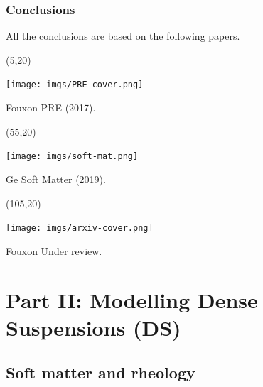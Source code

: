 \begin{frame}[noframenumbering,t]
  \frametitle{Conclusions}

  All the conclusions are based on the following papers.
  
  \begin{textblock}{45}(5,20)
    \begin{tcolorbox}[beamer,
        width=\textwidth,
        arc=0pt,
        boxsep=1pt,
        left=0pt,right=0pt,top=0pt,bottom=0pt,
      ]
      \texttt{[image: imgs/PRE\_cover.png]}
    \end{tcolorbox}
    Fouxon \etal PRE (2017).
  \end{textblock}

  \begin{textblock}{45}(55,20)
    \begin{tcolorbox}[beamer,
        width=\textwidth,
        arc=0pt,
        boxsep=1pt,
        left=0pt,right=0pt,top=0pt,bottom=0pt,
      ]
      \texttt{[image: imgs/soft-mat.png]}
    \end{tcolorbox}
    Ge \etal Soft Matter (2019).
  \end{textblock}

  \begin{textblock}{45}(105,20)
    \begin{tcolorbox}[beamer,
        width=\textwidth,
        arc=0pt,
        boxsep=1pt,
        left=0pt,right=0pt,top=0pt,bottom=0pt,
      ]
      \texttt{[image: imgs/arxiv-cover.png]}
    \end{tcolorbox}
    Fouxon \etal Under review.
  \end{textblock}

\end{frame}

\hypertarget{part2}{%
  \section{Part II: Modelling Dense Suspensions (DS)}}

\hypertarget{background2}{%
  \subsection{Soft matter and rheology}}

